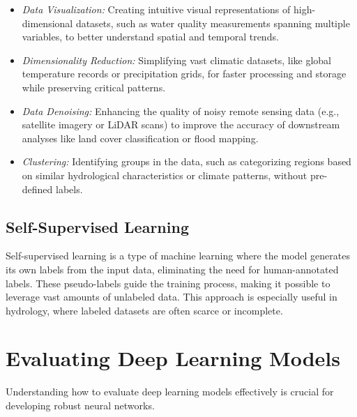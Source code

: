 \begin{itemize}
    \item \textit{Data Visualization:} Creating intuitive visual representations of high-dimensional datasets, such as water quality measurements spanning multiple variables, to better understand spatial and temporal trends.
    \item \textit{Dimensionality Reduction:} Simplifying vast climatic datasets, like global temperature records or precipitation grids, for faster processing and storage while preserving critical patterns.
    \item \textit{Data Denoising:} Enhancing the quality of noisy remote sensing data (e.g., satellite imagery or LiDAR scans) to improve the accuracy of downstream analyses like land cover classification or flood mapping.
    \item \textit{Clustering:} Identifying groups in the data, such as categorizing regions based on similar hydrological characteristics or climate patterns, without pre-defined labels.

\end{itemize}

\subsection{Self-Supervised Learning}
Self-supervised learning is a type of machine learning where the model generates its own labels from the input data, eliminating the need for human-annotated labels. These pseudo-labels guide the training process, making it possible to leverage vast amounts of unlabeled data. This approach is especially useful in hydrology, where labeled datasets are often scarce or incomplete.























\section{Evaluating Deep Learning Models}
Understanding how to evaluate deep learning models effectively is crucial for developing robust neural networks.

